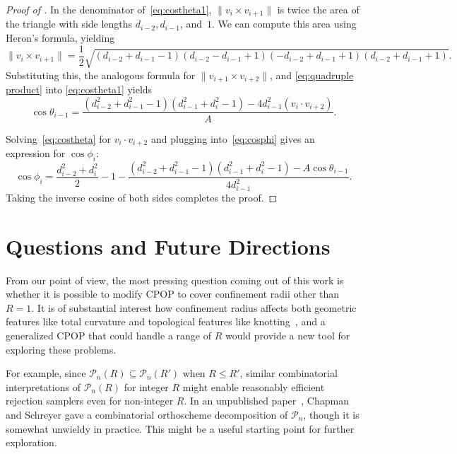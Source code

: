 \documentclass{article}
\theoremstyle{definition}
\begin{document}
\begin{proof}[{Proof of }]
	In the denominator of~\eqref{eq:costheta1}, $\|v_i \times v_{i+1}\|$ is twice the area of the triangle with side lengths $d_{i-2}, d_{i-1}$, and~$1$. We can compute this area using Heron's formula, yielding
	\[
		\|v_i \times v_{i+1}\| = \frac{1}{2} \sqrt{(d_{i-2}+d_{i-1}-1)(d_{i-2}-d_{i-1}+1)(-d_{i-2}+d_{i-1}+1)(d_{i-2}+d_{i-1}+1)}.
	\]
	Substituting this, the analogous formula for $\|v_{i+1}\times v_{i+2}\|$, and \eqref{eq:quadruple product} into \eqref{eq:costheta1} yields
	\begin{equation}\label{eq:costheta}
		 \cos\theta_{i-1}=\frac{(d_{i-2}^2 + d_{i-1}^2 - 1)(d_{i-1}^2 + d_{i}^2 - 1) - 4d_{i-1}^2 (v_i \cdot v_{i+2})}{A}.
	\end{equation}
	
	
	
	Solving~\eqref{eq:costheta} for $v_i \cdot v_{i+2}$ and plugging into~\eqref{eq:cosphi} gives an expression for $\cos \phi_i$:
	\[
		\cos\phi_i = \frac{d_{i-2}^2+d_i^2}{2} - 1 - \frac{(d_{i-2}^2 + d_{i-1}^2 - 1)(d_{i-1}^2 + d_{i}^2 - 1) - A \cos \theta_{i-1}}{4 d_{i-1}^2}.
	\]
	Taking the inverse cosine of both sides completes the proof.
	\end{proof}
	
	
\section{Questions and Future Directions} 
\label{sec:conclusion}

From our point of view, the most pressing question coming out of this work is whether it is possible to modify CPOP to cover confinement radii other than $R=1$. It is of substantial interest how confinement radius affects both geometric features like total curvature and topological features like knotting~\cite{diaoAverageCrossingNumber2018,diaoCurvatureRandomWalks2013,diaoKnotSpectrumConfined2014,diaoRelativeFrequenciesAlternating2018,diaoTotalCurvatureTotal2018,ernstKnottingSpectrumPolygonal2021}, and a generalized CPOP that could handle a range of $R$ would provide a new tool for exploring these problems.

For example, since $\mathcal{P}_n(R) \subseteq \mathcal{P}_n(R')$ when $R \leq R'$, similar combinatorial interpretations of $\mathcal{P}_n(R)$ for integer $R$ might enable reasonably efficient rejection samplers even for non-integer $R$. In an unpublished paper~\cite{chapmanOrthoschemesCoordinateSystem2019}, Chapman and Schreyer gave a combinatorial orthoscheme decomposition of $\mathcal{P}_n$, though it is somewhat unwieldy in practice. This might be a useful starting point for further exploration.
\end{document}
